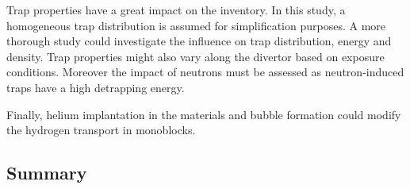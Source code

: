 Trap properties have a great impact on the inventory.
In this study, a homogeneous trap distribution is assumed for simplification purposes.
A more thorough study could investigate the influence on trap distribution, energy and density.
Trap properties might also vary along the divertor based on exposure conditions.
Moreover the impact of neutrons must be assessed as neutron-induced traps have a high detrapping energy.



Finally, helium implantation in the materials and bubble formation could modify the hydrogen transport in monoblocks.
\subsection{Summary}